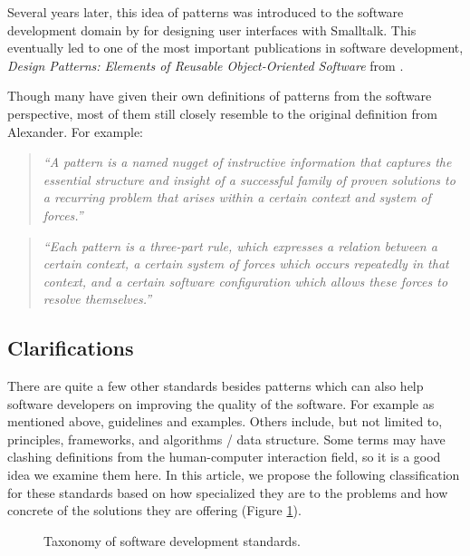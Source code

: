 \documentclass[a4paper,titlepage]{article}
\begin{document}
Several years later, this idea of patterns was introduced to the
software development domain by \citet{patterns:beck} for designing
user interfaces with Smalltalk. This eventually led to one of the most
important publications in software development, \textit{Design
  Patterns: Elements of Reusable Object-Oriented Software} from
\citet{patterns:gamma}.

Though many have given their own definitions of patterns from the
software perspective, most of them still closely resemble to the
original definition from Alexander. For example:
\begin{quote}
  {\it ``A pattern is a named nugget of instructive information that
    captures the essential structure and insight of a successful
    family of proven solutions to a recurring problem that arises
    within a certain context and system of forces.''}

  \raggedleft \citet{patterns:appleton}
\end{quote}

\begin{quote}
  {\it ``Each pattern is a three-part rule, which expresses a relation
    between a certain context, a certain system of forces which occurs
    repeatedly in that context, and a certain software configuration
    which allows these forces to resolve themselves.''}

  \raggedleft \citet{timeless:gabriel}
\end{quote}

\subsection{Clarifications}
There are quite a few other standards besides patterns which can also
help software developers on improving the quality of the software. For
example as mentioned above, guidelines and examples. Others include,
but not limited to, principles, frameworks, and algorithms / data
structure. Some terms may have clashing definitions from the
human-computer interaction field, so it is a good idea we examine them
here. In this article, we propose the following classification for
these standards based on how specialized they are to the problems and
how concrete of the solutions they are offering (Figure
\ref{fig:standards}).

\begin{figure}[!t]
\centering

\caption{Taxonomy of software development standards.}
\label{fig:standards}
\end{figure}
\end{document}
